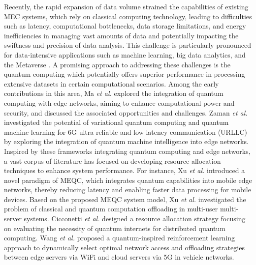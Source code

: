 \documentclass[journal]{IEEEtran}
\begin{document}
Recently, the rapid expansion of data volume strained the capabilities of existing  MEC systems, which rely on classical computing technology, leading to difficulties such as latency, computational bottlenecks, data storage limitations, and energy inefficiencies in managing vast amounts of data and potentially impacting the swiftness and precision of data analysis.
This challenge is particularly pronounced for data-intensive applications such as machine learning, big data analytics, and the Metaverse \cite{mystakidis2022metaverse}.
A promising approach to addressing these challenges is the quantum computing which potentially offers superior performance in processing extensive datasets in certain computational scenarios.
Among the early contributions in this area, Ma {\em et al. } \cite{ma2022hybrid} explored the integration of quantum computing with edge networks, aiming to enhance computational power and security, and discussed the associated opportunities and challenges.
Zaman {\em et al.} \cite{ zaman2023quantum} investigated the potential of variational quantum computing and quantum machine learning for 6G ultra-reliable and low-latency communication (URLLC) by exploring the integration of quantum machine intelligence into edge networks.
Inspired by these frameworks integrating quantum computing and edge networks, a vast corpus of literature has focused on developing resource allocation techniques to enhance system performance.
For instance, Xu {\em et al.} \cite{xu2022learning} introduced a novel paradigm of MEQC, which integrates quantum capabilities into mobile edge networks, thereby reducing latency and enabling faster data processing for mobile devices.
Based on the proposed MEQC system model, Xu {\em et al.} investigated the problem of classical and quantum computation offloading in multi-user multi-server systems.
Cicconetti {\em et al.} \cite{cicconetti2022resource} designed a resource allocation strategy focusing on evaluating the necessity of quantum internets for distributed quantum computing.
Wang {\em et al.} \cite{wang2021resource} proposed a quantum-inspired reinforcement learning approach to dynamically select optimal network access and offloading strategies between edge servers via WiFi and cloud servers via 5G in vehicle networks.
\end{document}

